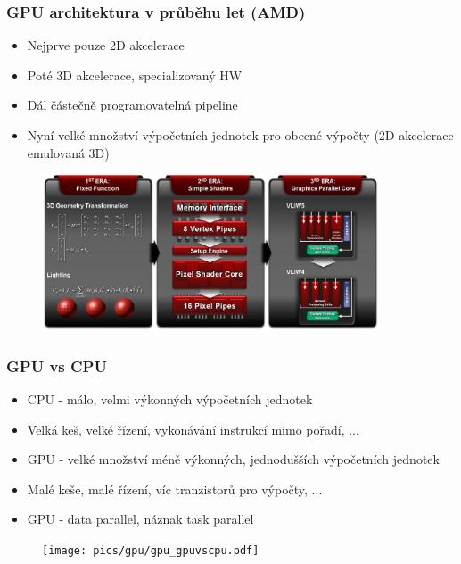 
\begin{frame}
\frametitle{GPU architektura v průběhu let (AMD)}
	\begin{itemize}
	\item Nejprve pouze 2D akcelerace
	\item Poté 3D akcelerace, specializovaný HW
	\item Dál částečně programovatelná pipeline
	\item Nyní velké množství výpočetních jednotek pro obecné výpočty (2D akcelerace emulovaná 3D)
	\end{itemize}
	\begin{figure}[h]
	\includegraphics[width=10cm,keepaspectratio]{pics/gpu/gpu_amdevoluce}
	\end{figure}
\end{frame}

\begin{frame}
\frametitle{GPU vs CPU}
	\begin{itemize}
	\item CPU - málo, velmi výkonných výpočetních jednotek
	\item Velká keš, velké řízení, vykonávání instrukcí mimo pořadí, ...
	\item GPU - velké množství méně výkonných, jednodušších výpočetních jednotek
	\item Malé keše, malé řízení, víc tranzistorů pro výpočty, ...
  \item GPU - data parallel, náznak task parallel
	\end{itemize}
	\begin{figure}[h]
	\texttt{[image: pics/gpu/gpu\_gpuvscpu.pdf]}
	\end{figure}
\end{frame}

